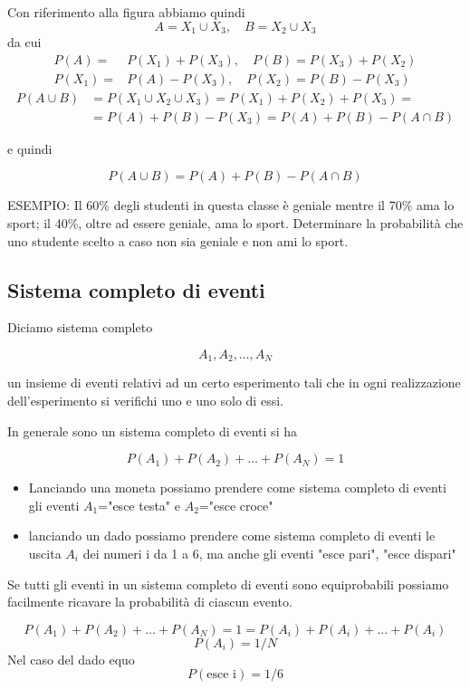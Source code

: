 \documentclass[onecolumn,12pt]{book}\usepackage[]{graphicx}\usepackage[]{color}
\begin{document}
Con riferimento alla figura abbiamo quindi
\[A=X_1\cup X_3, \quad B=X_2\cup X_3\]
da cui
\begin{align*} P(A)=&P(X_1)+P(X_3),\quad P(B)=P(X_3)+P(X_2)\\
 P(X_1)=&P(A)-P(X_3),\quad P(X_2)=P(B)-P(X_3)
 \end{align*}
\begin{align*} P(A\cup B)&=P(X_1\cup X_2\cup X_3)=P(X_1)+P(X_2)+P(X_3)=\\
&=P(A) +P(B)-P(X_3)=P(A) +P(B)-P(A\cap B)\end{align*}

e quindi 

$$P(A\cup B)=P(A) +P(B)-P(A\cap B)$$

\vskip20pt

ESEMPIO: Il 60\% degli studenti in questa classe è geniale mentre il   70\% ama lo sport; il 40\%, oltre ad essere geniale, ama lo sport. Determinare la probabilità che uno studente scelto a caso non sia geniale e non ami lo sport.

 \subsection{Sistema completo di eventi}

Diciamo sistema completo

$$A_1, A_2,\ldots, A_N$$

un insieme di eventi relativi ad un certo esperimento tali che in ogni realizzazione dell'esperimento si verifichi uno e uno solo di essi. 

In generale sono un sistema completo di eventi si ha 

$$P(A_1)+P(A_2)+\ldots+ P(A_N) =1$$

\begin{itemize}
\item Lanciando una moneta possiamo prendere come sistema completo di eventi gli eventi $A_1$="esce testa" e $A_2$="esce croce" 
\item lanciando un dado   possiamo prendere come sistema completo di eventi le uscita $A_i$ dei numeri i da 1 a 6, ma anche gli eventi "esce pari", "esce dispari"
\end{itemize}
Se tutti gli eventi in un sistema completo di eventi sono equiprobabili possiamo facilmente ricavare la probabilità di ciascun evento.
 
$$P(A_1)+P(A_2)+\ldots+ P(A_N) =1=P(A_i)+P(A_i)+\ldots+ P(A_i)$$
$$P(A_i)=1/N$$
Nel caso del dado equo
$$P(\textrm{esce i}) = 1/6$$
\end{document}
